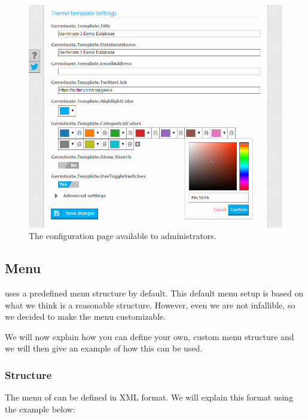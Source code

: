 \begin{figure}
	\centering
	\includegraphics[scale=0.4]{img/configuration/admin-config.png}
	\caption{The {\germinate} configuration page available to administrators.}
	\label{fig:admin-config}
\end{figure}

\subsection{{\germinate} Menu}
\label{sec:menu}
{\germinate} uses a predefined menu structure by default. This default menu setup is based on what we think is a reasonable structure. However, even we are not infallible, so we decided to make the menu customizable.

We will now explain how you can define your own, custom menu structure and we will then give an example of how this can be used.

\subsubsection{Structure}
The menu of {\germinate} can be defined in XML format. We will explain this format using the example below:

